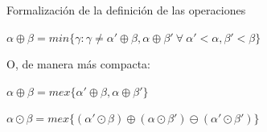 \documentclass[10pt,spanish]{beamer}
\begin{document}
\begin{frame}{Formalización de la definición de las operaciones}

\begin{definition}[Suma]
	$\alpha \oplus \beta = min \{\gamma: \gamma \neq \alpha' \oplus \beta, \alpha \oplus \beta'\ \forall\ \alpha'<\alpha, \beta'<\beta \}$
	
	O, de manera más compacta:
	
	$\alpha \oplus \beta = mex\{ \alpha'\oplus\beta, \alpha\oplus\beta'\}$
\end{definition}


\begin{definition}[Producto]

	$\alpha \odot \beta = mex\{ (\alpha'\odot \beta) \oplus (\alpha \odot \beta') \ominus (\alpha' \odot \beta')\}$
\end{definition}


\end{frame}


\end{document}
